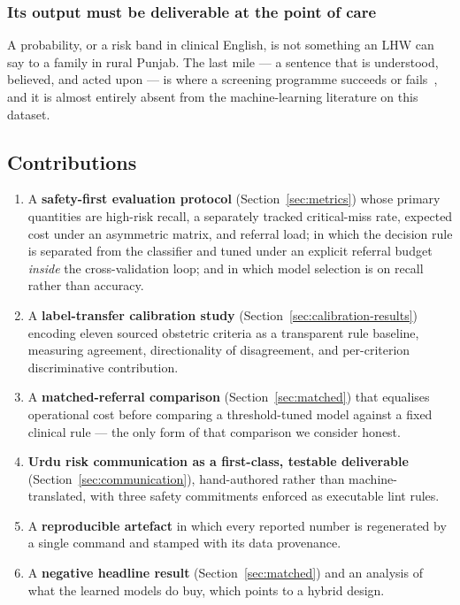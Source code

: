 \documentclass[journal]{IEEEtran}
\begin{document}
\subsubsection{Its output must be deliverable at the point of care}
A probability, or a risk band in clinical English, is not something an LHW can
say to a family in rural Punjab. The last mile --- a sentence that is
understood, believed, and acted upon --- is where a screening programme succeeds
or fails~\cite{kelly2019challenges}, and it is almost entirely absent from the
machine-learning literature on this dataset.

\subsection{Contributions}
\begin{enumerate}
\item A \textbf{safety-first evaluation protocol} (Section~\ref{sec:metrics})
whose primary quantities are high-risk recall, a separately tracked
critical-miss rate, expected cost under an asymmetric matrix, and referral load;
in which the decision rule is separated from the classifier and tuned under an
explicit referral budget \emph{inside} the cross-validation loop; and in which
model selection is on recall rather than accuracy.
\item A \textbf{label-transfer calibration study}
(Section~\ref{sec:calibration-results}) encoding eleven sourced obstetric
criteria as a transparent rule baseline, measuring agreement, directionality of
disagreement, and per-criterion discriminative contribution.
\item A \textbf{matched-referral comparison} (Section~\ref{sec:matched}) that
equalises operational cost before comparing a threshold-tuned model against a
fixed clinical rule --- the only form of that comparison we consider honest.
\item \textbf{Urdu risk communication as a first-class, testable deliverable}
(Section~\ref{sec:communication}), hand-authored rather than machine-translated,
with three safety commitments enforced as executable lint rules.
\item A \textbf{reproducible artefact} in which every reported number is
regenerated by a single command and stamped with its data provenance.
\item A \textbf{negative headline result} (Section~\ref{sec:matched}) and an
analysis of what the learned models do buy, which points to a hybrid design.
\end{enumerate}
\end{document}
